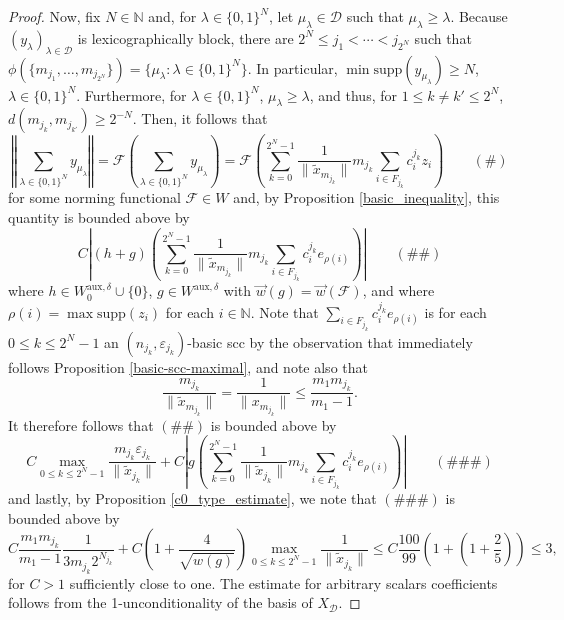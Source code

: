 \documentclass[12pt,a4paper]{amsart}
\newcommand{\N}{\mathbb{N}}
\newcommand{\bes}{\begin{equation*}}
\newcommand{\ees}{\end{equation*}}
\newcommand{\ep}{\varepsilon}
\newcommand{\supp}{\text{supp}}
\theoremstyle{definition}
\theoremstyle{plain}
\begin{document}
\begin{proof}
 
Now, fix $N\in\N$ and, for $\lambda\in\{0,1\}^N$, let $\mu_\lambda\in\mathcal{D}$ such that $\mu_\lambda\geq \lambda$. Because $(y_\lambda)_{\lambda\in\mathcal{D}}$ is lexicographically block, there are $2^N\leq j_1<\cdots<j_{2^N}$ such that $\phi(\{m_{j_1},\ldots,m_{j_{2^N}}\}) = \{\mu_\lambda:\lambda\in\{0,1\}^N\}$. In particular, $\min\supp(y_{\mu_\lambda})\geq N$, $\lambda\in\{0,1\}^N$. Furthermore, for $\lambda\in\{0,1\}^N$, $\mu_\lambda\geq\lambda$, and thus, for $1\leq k\neq k'\leq 2^N$, $d(m_{j_k},m_{j_{k'}}) \geq 2^{-N}$. Then, it follows that
\bes \left\Vert \sum_{\lambda\in\{0,1\}^N}y_{\mu_\lambda}\right\Vert =\mathscr{F}\left(\sum_{\lambda\in\{0,1\}^N}y_{\mu_\lambda}\right) =\mathscr{F}\left(\sum_{k=0}^{2^{N}-1}\frac{1}{\|\tilde{x}_{m_{j_{k}}}\|}m_{j_{k}}\sum_{i\in F_{j_{k}}}c^{j_{k}}_{i}z_{i}\right) \qquad (\#) \ees
for some norming functional $\mathscr{F}\in W$ and, by Proposition \ref{basic_inequality}, this quantity is bounded above by
\bes C\left\vert (h+g)\left(\sum_{k=0}^{2^{N}-1}\frac{1}{\|\tilde{x}_{m_{j_{k}}}\|}m_{j_{k}}\sum_{i\in F_{j_{k}}}c^{j_{k}}_{i}e_{\rho(i)}\right)\right\vert \qquad (\#\#) \ees
where $h\in W^{\text{aux},\delta}_{0}\cup\{0\}$, $g\in W^{\text{aux},\delta}$ with $\vec w(g)=\vec w(\mathscr{F})$, and where $\rho(i)=\max\supp(z_{i})$ for each $i\in\N$. Note that $\sum_{i\in F_{j_{k}}}c^{j_{k}}_{i}e_{\rho(i)}$ is for each $0\leq k\leq 2^{N}-1$ an $(n_{j_{k}},\ep_{j_{k}})$-basic scc by the observation that immediately follows Proposition \ref{basic-scc-maximal}, and note also that
\[\frac{m_{j_{k}}}{\|\tilde{x}_{m_{j_{k}}}\|}=\frac{1}{\|x_{m_{j_{k}}}\|}\leq \frac{m_{1}m_{j_{k}}}{m_{1}-1}.\]
It therefore follows that $(\#\#)$ is bounded above by
\bes C\max_{0\leq k\leq 2^{N}-1}\frac{m_{j_{k}}\ep_{j_{k}}}{\|\tilde{x}_{j_{k}}\|} +C\left\vert g\left(\sum_{k=0}^{2^{N}-1}\frac{1}{\|\tilde{x}_{j_{k}}\|}m_{j_{k}}\sum_{i\in F_{j_{k}}}c^{j_{k}}_{i}e_{\rho(i)}\right)\right\vert \qquad (\#\#\#)  \ees
and lastly, by Proposition \ref{c0_type_estimate}, we note that $(\#\#\#)$ is bounded above by
\bes C\frac{m_{1}m_{j_{k}}}{m_{1}-1}\frac{1}{3m_{j_{k}} 2^{N_{j_{k}}}}+C\left(1+\frac{4}{\sqrt{w(g)}}\right)\max_{0\leq k\leq 2^{N}-1}\frac{1}{\|\tilde{x}_{j_{k}}\|} \leq C\frac{100}{99}\left(1+\left(1+\frac{2}{5}\right)\right)\leq 3, \ees
for $C>1$ sufficiently close to one. The estimate for arbitrary scalars coefficients follows from the 1-unconditionality of the basis of $X_\mathcal{D}$.
\end{proof}
\end{document}
